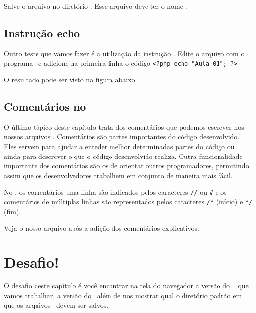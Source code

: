 Salve o arquivo no diretório . Esse arquivo deve ter o nome .


\subsection{Instrução echo}
\label{subsection:funcao-echo}
Outro teste que vamos fazer é a utilização da instrução \funcaoecho. Edite o arquivo 
 com o programa \gedit~e adicione na primeira linha o código
\texttt{<?php echo "Aula 01"; ?>}



O resultado pode ser visto na figura abaixo.

\subsection{Comentários no \php}
\label{subsection:comentarios-no-php}

O último tópico deste capítulo trata dos comentários que podemos escrever nos nossos
arquivos \phpextensao. Comentários são partes importantes do código desenvolvido.
Eles servem para ajudar a enteder melhor determinadas partes do código ou ainda
para descrever o que o código desenvolvido realiza. Outra funcionalidade
importante dos comentários são os de orientar outros programadores, permitindo assim
que os desenvolvedores trabalhem em conjunto de maneira mais fácil.

No \php, os comentários uma linha são indicados pelos caracteres \verb$//$ ou \verb$#$
e os comentários de múltiplas linhas são representados pelos caracteres 
\verb$/*$ (início) e \verb$*/$ (fim).

Veja o nosso arquivo  após a adição dos comentários explicativos.



\section{Desafio!}
\label{desafio}
O desafio deste capítulo é você encontrar na tela do navegador a versão do \php~
que vamos trabalhar, a versão do \apache~além de nos mostrar qual o diretório
padrão em que os arquivos \phpextensao~devem ser salvos.